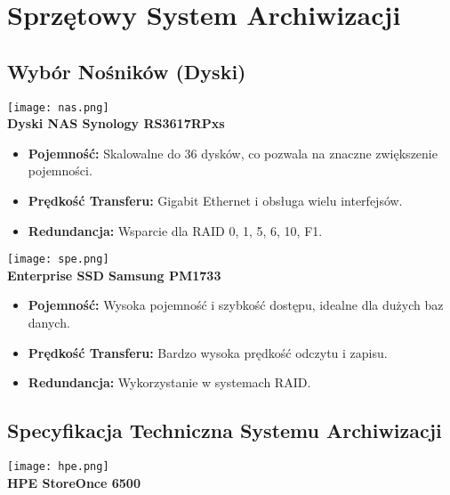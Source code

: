 \section{Sprzętowy System Archiwizacji}
    \subsection{Wybór Nośników (Dyski)}

    


    \texttt{[image: nas.png]}\\
        \textbf{Dyski NAS Synology RS3617RPxs}\\
       
        \begin{itemize}
            \item \textbf{Pojemność:} Skalowalne do 36 dysków, co pozwala na znaczne zwiększenie pojemności.
            \item \textbf{Prędkość Transferu:} Gigabit Ethernet i obsługa wielu interfejsów.
            \item \textbf{Redundancja:} Wsparcie dla RAID 0, 1, 5, 6, 10, F1.
        \end{itemize}


        \texttt{[image: spe.png]}\\
        \textbf{Enterprise SSD Samsung PM1733}\\

        
        \begin{itemize}
            \item \textbf{Pojemność:} Wysoka pojemność i szybkość dostępu, idealne dla dużych baz danych.
            \item \textbf{Prędkość Transferu:} Bardzo wysoka prędkość odczytu i zapisu.
            \item \textbf{Redundancja:} Wykorzystanie w systemach RAID.
        \end{itemize}




    \subsection{Specyfikacja Techniczna Systemu Archiwizacji}

            \texttt{[image: hpe.png]}\\
            \textbf{HPE StoreOnce 6500}\\


